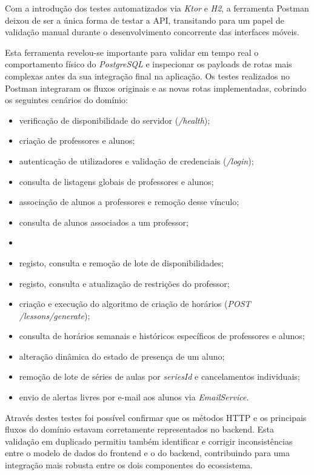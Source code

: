 Com a introdução dos testes automatizados via \textit{Ktor} e \textit{H2}, a ferramenta Postman deixou de ser a única forma de testar a API, transitando para um papel de validação manual durante o desenvolvimento concorrente das interfaces móveis.

Esta ferramenta revelou-se importante para validar em tempo real o comportamento físico do \textit{PostgreSQL} e inspecionar os payloads de rotas mais complexas antes da sua integração final na aplicação.
Os testes realizados no Postman integraram os fluxos originais e as novas rotas implementadas, cobrindo os seguintes cenários do domínio:

\begin{itemize}
    \item verificação de disponibilidade do servidor (\textit{/health});
    \item criação de professores e alunos;
    \item autenticação de utilizadores e validação de credenciais (\textit{/login});
    \item consulta de listagens globais de professores e alunos;
    \item associação de alunos a professores e remoção desse vínculo;
    \item consulta de alunos associados a um professor;
    \item \item registo, consulta e remoção de lote de disponibilidades;
    \item registo, consulta e atualização de restrições do professor;
    \item criação e execução do algoritmo de criação de horários (\textit{POST /lessons/generate});
    \item consulta de horários semanais e históricos específicos de professores e alunos;
    \item alteração dinâmica do estado de presença de um aluno;
    \item remoção de lote de séries de aulas por \textit{seriesId} e cancelamentos individuais;
    \item envio de alertas livres por e-mail aos alunos via \textit{EmailService}.
\end{itemize}

Através destes testes foi possível confirmar que os métodos HTTP e os principais fluxos do domínio estavam corretamente representados no backend. Esta validação em duplicado permitiu também identificar e corrigir inconsistências entre o modelo de dados do frontend e o do backend, contribuindo para uma integração mais robusta entre os dois componentes do ecossistema.



